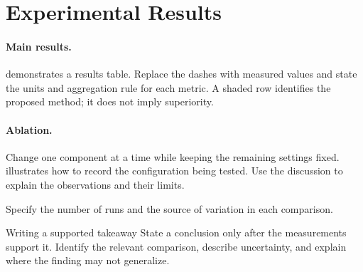 \section{Experimental Results}
\label{sec:experiments}
\paragraph{Main results.}
 demonstrates a results table. Replace the dashes with
measured values and state the units and aggregation rule for each metric.
A shaded row identifies the proposed method; it does not imply superiority.



\paragraph{Ablation.}
Change one component at a time while keeping the remaining settings fixed.
 illustrates how to record the configuration being tested.
Use the discussion to explain the observations and their limits.



\label{obs:comparison}
Specify the number of runs and the source of variation in each comparison.

\begin{rpsinsight}{Writing a supported takeaway}
State a conclusion only after the measurements support it. Identify the
relevant comparison, describe uncertainty, and explain where the finding
may not generalize.
\end{rpsinsight}

